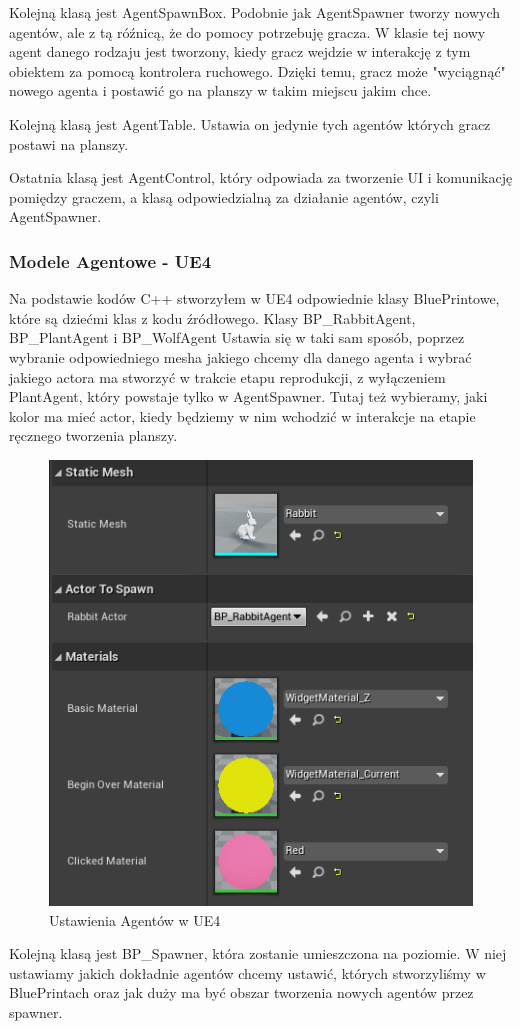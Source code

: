\documentclass[a4paper,12pt,reqno]{article}
\begin{document}
Kolejną klasą jest AgentSpawnBox. Podobnie jak AgentSpawner tworzy nowych agentów, ale z tą róźnicą, że do pomocy potrzebuję gracza. W klasie tej nowy agent danego rodzaju jest tworzony, kiedy gracz wejdzie w interakcję z tym obiektem za pomocą kontrolera ruchowego. Dzięki temu, gracz może "wyciągnąć" nowego agenta i postawić go na planszy w takim miejscu jakim chce. 

Kolejną klasą jest AgentTable. Ustawia on jedynie tych agentów których gracz postawi na planszy.

Ostatnia klasą jest AgentControl, który odpowiada za tworzenie UI i komunikację pomiędzy graczem, a klasą odpowiedzialną za działanie agentów, czyli AgentSpawner. 

\subsubsection{Modele Agentowe - UE4}

Na podstawie kodów C++ stworzyłem w UE4 odpowiednie klasy BluePrintowe, które są dziećmi klas z kodu źródłowego. Klasy BP\_RabbitAgent, BP\_PlantAgent i BP\_WolfAgent
Ustawia się w taki sam sposób, poprzez wybranie odpowiedniego mesha jakiego chcemy dla danego agenta i wybrać jakiego actora ma stworzyć w trakcie etapu reprodukcji, z wyłączeniem PlantAgent, który powstaje tylko w AgentSpawner. Tutaj też wybieramy, jaki kolor ma mieć actor, kiedy będziemy w nim wchodzić w interakcje na etapie ręcznego tworzenia planszy.

\begin{figure}[H]%
\centering
\includegraphics[width=0.4\columnwidth]{graphics//agent/BP_AgentActor.png}
\caption{Ustawienia Agentów w UE4 
\label{BPExample}}%
%
\qquad
\end{figure} 


Kolejną klasą jest BP\_Spawner, która zostanie umieszczona na poziomie. W niej ustawiamy jakich dokładnie agentów chcemy ustawić, których stworzyliśmy w BluePrintach oraz jak duży ma być obszar tworzenia nowych agentów przez spawner.
\end{document}
